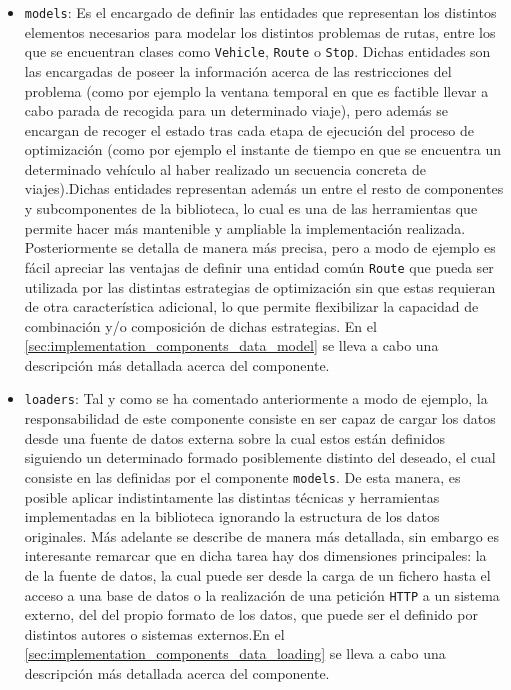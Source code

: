 \documentclass{subfiles}
\begin{document}
          \begin{itemize}
              \item \texttt{models}: Es el encargado de definir las entidades que representan los distintos elementos necesarios para modelar los distintos problemas de rutas, entre los que se encuentran clases como \texttt{Vehicle}, \texttt{Route} o \texttt{Stop}. Dichas entidades son las encargadas de poseer la información acerca de las restricciones del problema (como por ejemplo la ventana temporal en que es factible llevar a cabo parada de recogida para un determinado viaje), pero además se encargan de recoger el estado tras cada etapa de ejecución del proceso de optimización (como por ejemplo el instante de tiempo en que se encuentra un determinado vehículo al haber realizado un secuencia concreta de viajes).Dichas entidades representan además un  entre el resto de componentes y subcomponentes de la biblioteca, lo cual es una de las herramientas que permite hacer más mantenible y ampliable la implementación realizada. Posteriormente se detalla de manera más precisa, pero a modo de ejemplo es fácil apreciar las ventajas de definir una entidad común \texttt{Route} que pueda ser utilizada por las distintas estrategias de optimización sin que estas requieran de otra característica adicional, lo que permite flexibilizar la capacidad de combinación y/o composición de dichas estrategias. En el \cref{sec:implementation_components_data_model} se lleva a cabo una descripción más detallada acerca del componente.

              \item \texttt{loaders}: Tal y como se ha comentado anteriormente a modo de ejemplo, la responsabilidad de este componente consiste en ser capaz de cargar los datos desde una fuente de datos externa sobre la cual estos están definidos siguiendo un determinado formado posiblemente distinto del deseado, el cual consiste en las definidas por el componente \texttt{models}. De esta manera, es posible aplicar indistintamente las distintas técnicas y herramientas implementadas en la biblioteca ignorando la estructura de los datos originales. Más adelante se describe de manera más detallada, sin embargo es interesante remarcar que en dicha tarea hay dos dimensiones principales: la  de la fuente de datos, la cual puede ser desde la carga de un fichero hasta el acceso a una base de datos o la realización de una petición \texttt{HTTP} a un sistema externo, del  del propio formato de los datos, que puede ser el definido por distintos autores o sistemas externos.En el \cref{sec:implementation_components_data_loading} se lleva a cabo una descripción más detallada acerca del componente.


\end{itemize}
\end{document}
